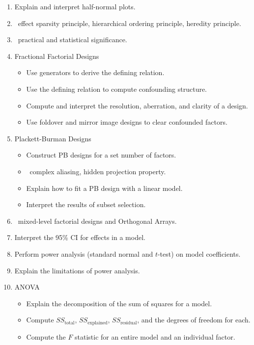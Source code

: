 \documentclass[pal,wide]{pajarticle}
\begin{document}
\begin{enumerate}
	\item Explain and interpret half-normal plots.
	\item \Vocab\ effect sparsity principle, hierarchical ordering principle, heredity principle.
	\item \Vocab\ practical and statistical significance.
	\item Fractional Factorial Designs
	\begin{itemize}
		\item Use generators to derive the defining relation.
		\item Use the defining relation to compute confounding structure.
		\item Compute and interpret the resolution, aberration, and clarity of a design.
		\item Use foldover and mirror image designs to clear confounded factors.
	\end{itemize}
	\item Plackett-Burman Designs
	\begin{itemize}
		\item Construct PB designs for a set number of factors.
		\item \Vocab\ complex aliasing, hidden projection property.
		\item Explain how to fit a PB design with a linear model.
		\item Interpret the results of subset selection.
	\end{itemize}
	\item \Vocab\ mixed-level factorial designs and Orthogonal Arrays.
	\item Interpret the 95\% CI for effects in a model.
	\item Perform power analysis (standard normal and $t$-test) on model coefficients.
	\item Explain the limitations of power analysis.
	\item ANOVA
	\begin{itemize}
		\item Explain the decomposition of the sum of squares for a model.
		\item Compute $SS_\text{total}$, $SS_\text{explained}$, $SS_\text{residual}$, and the degrees of freedom for each.
		\item Compute the $F$ statistic for an entire model and an individual factor.
	\end{itemize}
\end{enumerate}
\end{document}
